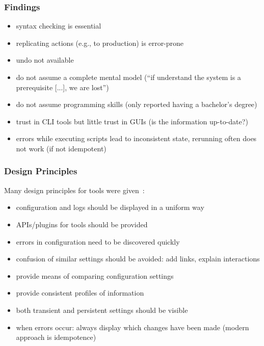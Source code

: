 \begin{frame}
	\frametitle{Findings \cite{barrett2004field}}

	\begin{itemize}[<+-| alert@+>]
	\item syntax checking is essential
	\item replicating actions (e.g., to production) is error-prone
	\item undo not available
	\item do not assume a complete mental model (``if understand the system is a prerequisite [...], we are lost'')
	\item do not assume programming skills (only  reported having a bachelor's degree)
	\item trust in CLI tools but little trust in GUIs (is the information up-to-date?)
	\item errors while executing scripts lead to inconsistent state, rerunning often does not work (if not idempotent)
	\end{itemize}
\end{frame}

\begin{frame}
	\frametitle{Design Principles \cite{haber2007design}}

	Many design principles for tools were given~\cite{haber2007design}:

	\begin{itemize}[<+-| alert@+>]
	\item configuration and logs should be displayed in a uniform way
	\item APIs/plugins for tools should be provided
	\item errors in configuration need to be discovered quickly
	\item confusion of similar settings should be avoided: add links, explain interactions
	\item provide means of comparing configuration settings
	\item provide consistent profiles of information
	\item both transient and persistent settings should be visible
	\item when errors occur: always display which changes have been made (modern approach is idempotence)
	\end{itemize}
\end{frame}

